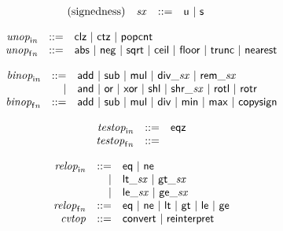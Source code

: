 \vspace{1ex}

$$
\begin{array}{@{}lrrl@{}l@{}}
\mbox{(signedness)} & {\mathit{sx}} &::=& \mathsf{u} ~|~ \mathsf{s} \\
\end{array}
$$

$$
\begin{array}{@{}lrrl@{}l@{}}
& {{\mathit{unop}}}_{{\mathsf{i}}{{\mathit{n}}}} &::=& \mathsf{clz} ~|~ \mathsf{ctz} ~|~ \mathsf{popcnt} \\
& {{\mathit{unop}}}_{{\mathsf{f}}{{\mathit{n}}}} &::=& \mathsf{abs} ~|~ \mathsf{neg} ~|~ \mathsf{sqrt} ~|~ \mathsf{ceil} ~|~ \mathsf{floor} ~|~ \mathsf{trunc} ~|~ \mathsf{nearest} \\
\end{array}
$$

$$
\begin{array}{@{}lrrl@{}l@{}}
& {{\mathit{binop}}}_{{\mathsf{i}}{{\mathit{n}}}} &::=& \mathsf{add} ~|~ \mathsf{sub} ~|~ \mathsf{mul} ~|~ {\mathsf{div\_}}{{\mathit{sx}}} ~|~ {\mathsf{rem\_}}{{\mathit{sx}}} \\ &&|&
\mathsf{and} ~|~ \mathsf{or} ~|~ \mathsf{xor} ~|~ \mathsf{shl} ~|~ {\mathsf{shr\_}}{{\mathit{sx}}} ~|~ \mathsf{rotl} ~|~ \mathsf{rotr} \\
& {{\mathit{binop}}}_{{\mathsf{f}}{{\mathit{n}}}} &::=& \mathsf{add} ~|~ \mathsf{sub} ~|~ \mathsf{mul} ~|~ \mathsf{div} ~|~ \mathsf{min} ~|~ \mathsf{max} ~|~ \mathsf{copysign} \\
\end{array}
$$

$$
\begin{array}{@{}lrrl@{}l@{}}
& {{\mathit{testop}}}_{{\mathsf{i}}{{\mathit{n}}}} &::=& \mathsf{eqz} \\
& {{\mathit{testop}}}_{{\mathsf{f}}{{\mathit{n}}}} &::=&  \\
\end{array}
$$

$$
\begin{array}{@{}lrrl@{}l@{}}
& {{\mathit{relop}}}_{{\mathsf{i}}{{\mathit{n}}}} &::=& \mathsf{eq} ~|~ \mathsf{ne} \\ &&|&
{\mathsf{lt\_}}{{\mathit{sx}}} ~|~ {\mathsf{gt\_}}{{\mathit{sx}}} \\ &&|&
{\mathsf{le\_}}{{\mathit{sx}}} ~|~ {\mathsf{ge\_}}{{\mathit{sx}}} \\
& {{\mathit{relop}}}_{{\mathsf{f}}{{\mathit{n}}}} &::=& \mathsf{eq} ~|~ \mathsf{ne} ~|~ \mathsf{lt} ~|~ \mathsf{gt} ~|~ \mathsf{le} ~|~ \mathsf{ge} \\
& {\mathit{cvtop}} &::=& \mathsf{convert} ~|~ \mathsf{reinterpret} \\
\end{array}
$$


